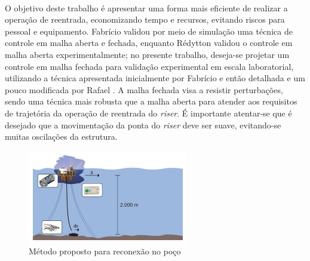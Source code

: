 \paragraph{} O objetivo deste trabalho é apresentar uma forma mais eficiente de realizar a operação de reentrada, economizando tempo e recursos, evitando riscos para pessoal e equipamento. Fabrício \cite{fabricioIFAC} validou por meio de simulação uma técnica de controle em malha aberta e fechada, enquanto Rédytton \cite{redytton} validou o controle em malha aberta experimentalmente; no presente trabalho, deseja-se projetar um controle em malha fechada para validação experimental em escala laboratorial, utilizando a técnica apresentada inicialmente por Fabrício \cite{fabricioIFAC} e então detalhada e um pouco modificada por Rafael \cite{rafaelMestrado}. A malha fechada visa a resistir perturbações, sendo uma técnica mais robusta que a malha aberta para atender aos requisitos de trajetória da operação de reentrada do \textit{riser}. É importante atentar-se que é desejado que a movimentação da ponta do \textit{riser} deve ser suave, evitando-se muitas oscilações da estrutura.

\begin{figure}[ht!]
\centering
  \includegraphics[width=7cm]{figs/introducao/posicionamentoProposto}
  \caption{Método proposto para reconexão no poço \cite{redytton} \label{posicionamentoProposto}}
\end{figure}

